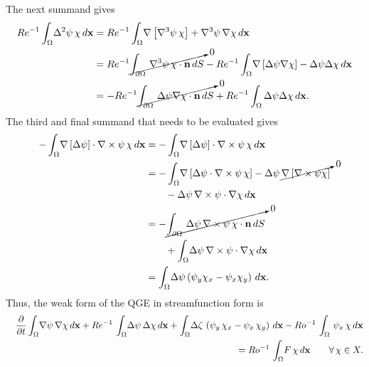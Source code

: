 The next summand gives
\begin{align*}
  Re^{-1}\int_{\Omega}\! \Delta^2 \psi\, \chi \, d\mathbf{x} &= Re^{-1}\int_{\Omega}\! \nabla\left[
    \nabla^3 \psi \, \chi \right] + \nabla^3 \psi\, \nabla \chi \, d\mathbf{x} \\
  &= Re^{-1}\cancelto{0}{\int_{\partial\Omega}\, \nabla^3 \psi\, \chi\cdot \mathbf{n}
    \, dS} - Re^{-1}\int_{\Omega}\! \nabla\left[ \Delta\psi \nabla \chi \right] - \Delta
    \psi \Delta \chi \, d\mathbf{x} \\
  &= -Re^{-1} \cancelto{0}{\int_{\partial\Omega}\, \Delta\psi \nabla \chi \cdot
    \mathbf{n}\, dS} + Re^{-1} \int_{\Omega} \Delta \psi \Delta \chi \,
    d\mathbf{x}.
\end{align*}
The third and final summand that needs to be evaluated gives
\begin{align*}
  -\int_{\Omega}\! \nabla\left[ \Delta\psi\right]\cdot
    \nabla\times\psi \, \chi \, d\mathbf{x} &= -\int_{\Omega}\!
    \nabla\left[\Delta\psi\right]\cdot \nabla\times\psi \, \chi\, d\mathbf{x}\\
  &= -\int_{\Omega}\! \nabla\left[ \Delta\psi \cdot \nabla\times\psi\, \chi
    \right] -\Delta\psi\, \cancelto{0}{\nabla\left[ \nabla\times\psi \chi
    \right]} \\
      &\qquad - \Delta\psi\, \nabla\times\psi \cdot \nabla\chi \, d\mathbf{x} \\
  &= -\cancelto{0}{\int_{\partial\Omega}\, \Delta\psi \, \nabla\times\psi\, \chi
    \cdot \mathbf{n} \, dS} \\
    &\qquad + \int_{\Omega}\! \Delta \psi \, \nabla\times \psi \cdot
      \nabla \chi \, d\mathbf{x} \\
  &= \int_{\Omega}\! \Delta\psi\left( \psi_y\chi_x - \psi_x\chi_y \right)\, d\mathbf{x}.
\end{align*}
Thus, the weak form of the QGE in streamfunction form is
\begin{eqnarray}
  && \frac{\partial}{\partial t} \int_{\Omega}\! \nabla \psi\, \nabla \chi  \, d\mathbf{x}
    + Re^{-1} \, \int_{\Omega}\! \Delta \psi \, \Delta \chi \, d{\bf x} + \int_{\Omega}\! \Delta
    \zeta \, \left( \psi_y \, \chi_x - \psi_x \, \chi_y \right)\, d{\bf x} - Ro^{-1} \, \int_{\Omega}
    \, \psi_x \, \chi \, d{\bf x} \nonumber \\
  && \hspace*{3.0cm} = Ro^{-1}\, \int_{\Omega}\! F \, \chi \, d{\bf x} \qquad \forall \, \chi \in X .
\label{eqn:qge_psi_weak}
\end{eqnarray}
